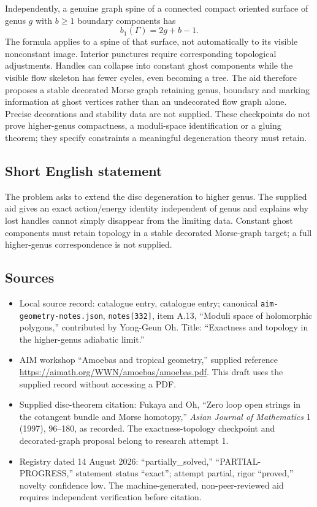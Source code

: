 \documentclass[11pt]{article}
\begin{document}
Independently, a genuine graph spine of a connected compact oriented surface of genus \(g\) with \(b\geq1\) boundary components has
\[
 b_1(\Gamma)=2g+b-1.
\]
The formula applies to a spine of that surface, not automatically to its visible nonconstant image. Interior punctures require corresponding topological adjustments. Handles can collapse into constant ghost components while the visible flow skeleton has fewer cycles, even becoming a tree. The aid therefore proposes a stable decorated Morse graph retaining genus, boundary and marking information at ghost vertices rather than an undecorated flow graph alone. Precise decorations and stability data are not supplied. These checkpoints do not prove higher-genus compactness, a moduli-space identification or a gluing theorem; they specify constraints a meaningful degeneration theory must retain.
\subsection{Short English statement}
The problem asks to extend the disc degeneration to higher genus. The supplied aid gives an exact action/energy identity independent of genus and explains why lost handles cannot simply disappear from the limiting data. Constant ghost components must retain topology in a stable decorated Morse-graph target; a full higher-genus correspondence is not supplied.
\subsection{Sources}
\begin{itemize}
\item Local source record: catalogue entry, catalogue entry; canonical \texttt{aim-geometry-notes.json}, \texttt{notes[332]}, item A.13, ``Moduli space of holomorphic polygons,'' contributed by Yong-Geun Oh. Title: ``Exactness and topology in the higher-genus adiabatic limit.''
\item AIM workshop ``Amoebas and tropical geometry,'' supplied reference \url{https://aimath.org/WWN/amoebas/amoebas.pdf}. This draft uses the supplied record without accessing a PDF.
\item Supplied disc-theorem citation: Fukaya and Oh, ``Zero loop open strings in the cotangent bundle and Morse homotopy,'' \emph{Asian Journal of Mathematics} 1 (1997), 96--180, as recorded. The exactness-topology checkpoint and decorated-graph proposal belong to research attempt 1.
\item Registry dated 14 August 2026: ``partially\_solved,'' ``PARTIAL-PROGRESS,'' statement status ``exact''; attempt partial, rigor ``proved,'' novelty confidence low. The machine-generated, non-peer-reviewed aid requires independent verification before citation.
\end{itemize}
\end{document}

